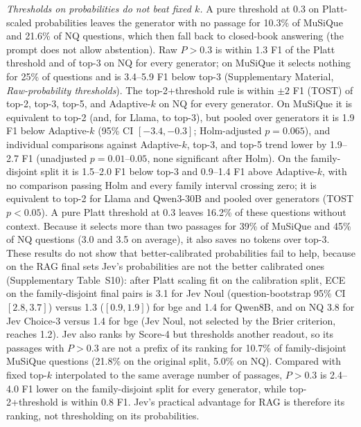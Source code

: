 \emph{Thresholds on probabilities do not beat fixed $k$.} A pure threshold at 0.3 on Platt-scaled probabilities leaves the generator with no passage for 10.3\% of MuSiQue and 21.6\% of NQ questions, which then fall back to closed-book answering (the prompt does not allow abstention). Raw $P>0.3$ is within 1.3 F1 of the Platt threshold and of top-3 on NQ for every generator; on MuSiQue it selects nothing for 25\% of questions and is 3.4--5.9 F1 below top-3 (Supplementary Material, \emph{Raw-probability thresholds}).
The top-2+threshold rule is within $\pm2$ F1 (TOST) of top-2, top-3, top-5, and Adaptive-$k$ on NQ for every generator. On MuSiQue it is equivalent to top-2 (and, for Llama, to top-3), but pooled over generators it is 1.9 F1 below Adaptive-$k$ (95\% CI $[-3.4,-0.3]$; Holm-adjusted $p=0.065$), and individual comparisons against Adaptive-$k$, top-3, and top-5 trend lower by 1.9--2.7 F1 (unadjusted $p=0.01$--$0.05$, none significant after Holm). On the family-disjoint split it is 1.5--2.0 F1 below top-3 and 0.9--1.4 F1 above Adaptive-$k$, with no comparison passing Holm and every family interval crossing zero; it is equivalent to top-2 for Llama and Qwen3-30B and pooled over generators (TOST $p<0.05$). A pure Platt threshold at 0.3 leaves 16.2\% of these questions without context. Because it selects more than two passages for 39\% of MuSiQue and 45\% of NQ questions (3.0 and 3.5 on average), it also saves no tokens over top-3.
These results do not show that better-calibrated probabilities fail to help, because on the RAG final sets Jev's probabilities are not the better calibrated ones (Supplementary Table~S10): after Platt scaling fit on the calibration split, ECE on the family-disjoint final pairs is 3.1 for Jev Noul (question-bootstrap 95\% CI $[2.8,3.7]$) versus 1.3 ($[0.9,1.9]$) for bge and 1.4 for Qwen8B, and on NQ 3.8 for Jev Choice-3 versus 1.4 for bge (Jev Noul, not selected by the Brier criterion, reaches 1.2). Jev also ranks by Score-4 but thresholds another readout, so its passages with $P>0.3$ are not a prefix of its ranking for 10.7\% of family-disjoint MuSiQue questions (21.8\% on the original split, 5.0\% on NQ). Compared with fixed top-$k$ interpolated to the same average number of passages, $P>0.3$ is 2.4--4.0 F1 lower on the family-disjoint split for every generator, while top-2+threshold is within 0.8 F1.
Jev's practical advantage for RAG is therefore its ranking, not thresholding on its probabilities.
